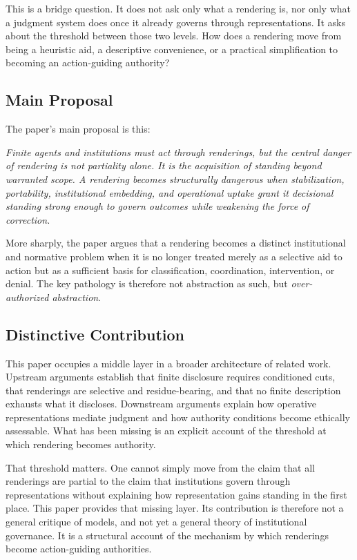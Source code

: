 \documentclass[11pt]{article}
\renewenvironment{quote}
  {\list{}{\leftmargin=1.4em \rightmargin=1.0em}%
   \item\relax\color{softink}\itshape}
  {\endlist}
\renewcommand{\emph}[1]{\textit{#1}}
\begin{document}
This is a bridge question. It does not ask only what a rendering is, nor only what a judgment system does once it already governs through representations. It asks about the threshold between those two levels. How does a rendering move from being a heuristic aid, a descriptive convenience, or a practical simplification to becoming an action-guiding authority?

\subsection{Main Proposal}

The paper's main proposal is this:

\begin{quote}
Finite agents and institutions must act through renderings, but the central danger of rendering is not partiality alone. It is the acquisition of standing beyond warranted scope. A rendering becomes structurally dangerous when stabilization, portability, institutional embedding, and operational uptake grant it decisional standing strong enough to govern outcomes while weakening the force of correction.
\end{quote}

More sharply, the paper argues that a rendering becomes a distinct institutional and normative problem when it is no longer treated merely as a selective aid to action but as a sufficient basis for classification, coordination, intervention, or denial. The key pathology is therefore not abstraction as such, but \emph{over-authorized abstraction}.

\subsection{Distinctive Contribution}

This paper occupies a middle layer in a broader architecture of related work. Upstream arguments establish that finite disclosure requires conditioned cuts, that renderings are selective and residue-bearing, and that no finite description exhausts what it discloses.\cite{Swanson2026ConstrainedDescribability,Swanson2026ConstraintConditionDisclosure,Swanson2026EmbeddedProcess} Downstream arguments explain how operative representations mediate judgment and how authority conditions become ethically assessable.\cite{Swanson2026MediatedJudgmentConstraint} What has been missing is an explicit account of the threshold at which rendering becomes authority.

That threshold matters. One cannot simply move from the claim that all renderings are partial to the claim that institutions govern through representations without explaining how representation gains standing in the first place. This paper provides that missing layer. Its contribution is therefore not a general critique of models, and not yet a general theory of institutional governance. It is a structural account of the mechanism by which renderings become action-guiding authorities.
\end{document}
